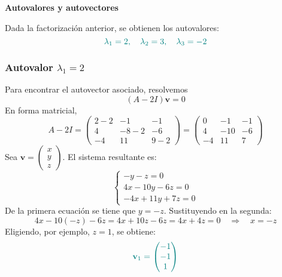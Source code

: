 \documentclass{article}
\begin{document}
\begin{enumerate}[label=\textbf{\alph*)}]
\textbf{Autovalores y autovectores}
    
Dada la factorización anterior, se obtienen los autovalores:
\[\color{teal}
\lambda_1 = 2, \quad \lambda_2 = 3, \quad \lambda_3 = -2
\]

\subsubsection*{Autovalor \( \lambda_1 = 2 \)}
Para encontrar el autovector asociado, resolvemos
\[
(A - 2I)\mathbf{v} = 0
\]
En forma matricial,
\[
A - 2I =
\begin{pmatrix}
2-2 & -1 & -1 \\
4 & -8-2 & -6 \\
-4 & 11 & 9-2
\end{pmatrix}
=
\begin{pmatrix}
0 & -1 & -1 \\
4 & -10 & -6 \\
-4 & 11 & 7
\end{pmatrix}
\]
Sea \( \mathbf{v} = \begin{pmatrix} x \\ y \\ z \end{pmatrix} \). El sistema resultante es:
\[
\begin{cases}
- y - z = 0 \\
4x - 10y - 6z = 0 \\
-4x + 11y + 7z = 0
\end{cases}
\]
De la primera ecuación se tiene que \( y = -z \). Sustituyendo en la segunda:
\[
4x - 10(-z) - 6z = 4x + 10z - 6z = 4x + 4z = 0 \quad \Longrightarrow \quad x = -z
\]
Eligiendo, por ejemplo, \( z = 1 \), se obtiene:
\[\color{teal}
\mathbf{v}_1 = \begin{pmatrix} -1 \\ -1 \\ 1 \end{pmatrix}
\]


\end{enumerate}
\end{document}
